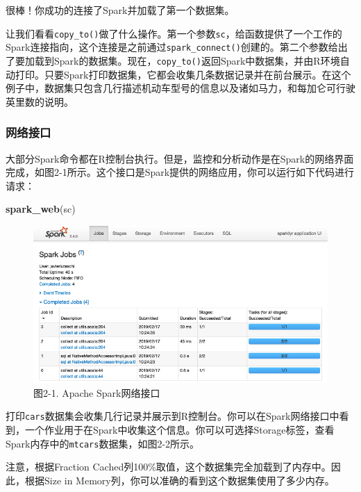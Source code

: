 \documentclass[
]{article}
\newenvironment{Shaded}{\begin{snugshade}}{\end{snugshade}}
\newcommand{\KeywordTok}[1]{\textcolor[rgb]{0.13,0.29,0.53}{\textbf{#1}}}
\newcommand{\NormalTok}[1]{#1}
\begin{document}
很棒！你成功的连接了Spark并加载了第一个数据集。

让我们看看\texttt{copy\_to()}做了什么操作。第一个参数\texttt{sc}，给函数提供了一个工作的Spark连接指向，这个连接是之前通过\texttt{spark\_connect()}创建的。第二个参数给出了要加载到Spark的数据集。现在，\texttt{copy\_to()}返回Spark中数据集，并由R环境自动打印。只要Spark打印数据集，它都会收集几条数据记录并在前台展示。在这个例子中，数据集只包含几行描述机动车型号的信息以及诸如马力，和每加仑可行驶英里数的说明。

\hypertarget{ux7f51ux7edcux63a5ux53e3}{%
\subsubsection{网络接口}\label{ux7f51ux7edcux63a5ux53e3}}

大部分Spark命令都在R控制台执行。但是，监控和分析动作是在Spark的网络界面完成，如图2-1所示。这个接口是Spark提供的网络应用，你可以运行如下代码进行请求：

\begin{Shaded}
\begin{Highlighting}[]
\KeywordTok{spark_web}\NormalTok{(sc)}
\end{Highlighting}
\end{Shaded}

\begin{figure}
\centering
\includegraphics{figures/2_1.png}
\caption{图2-1. Apache Spark网络接口}
\end{figure}

打印\texttt{cars}数据集会收集几行记录并展示到R控制台。你可以在Spark网络接口中看到，一个作业用于在Spark中收集这个信息。你可以可选择Storage标签，查看Spark内存中的\texttt{mtcars}数据集，如图2-2所示。

注意，根据Fraction
Cached列100\%取值，这个数据集完全加载到了内存中。因此，根据Size in
Memory列，你可以准确的看到这个数据集使用了多少内存。
\end{document}
